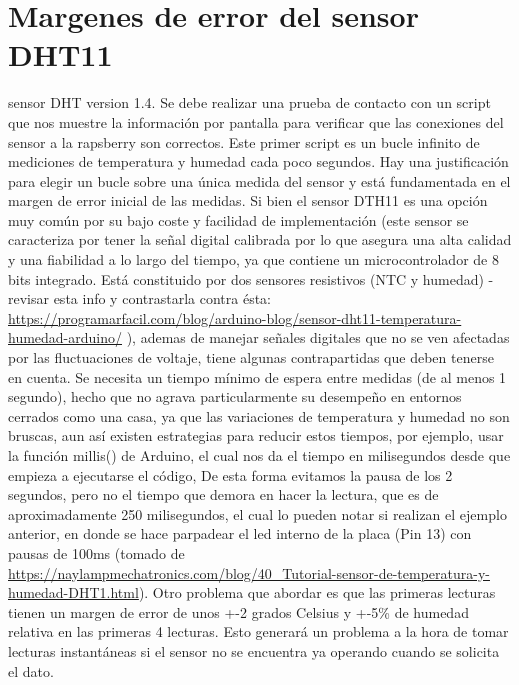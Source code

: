 \section{Margenes de error del sensor DHT11}
\label{AppendiB:key4}
sensor DHT version 1.4. Se debe realizar una prueba de contacto con un script que nos muestre la información por pantalla para verificar que las conexiones del sensor a la rapsberry son correctos. Este primer script es un bucle infinito de mediciones de temperatura y humedad cada poco segundos. Hay una justificación para elegir un bucle sobre una única medida del sensor y está fundamentada en el margen de error inicial de las medidas. Si bien el sensor DTH11 es una opción muy común por su bajo coste y facilidad de implementación (este sensor se caracteriza por tener la señal digital calibrada por lo que asegura una alta calidad y una fiabilidad a lo largo del tiempo, ya que contiene un microcontrolador de 8 bits integrado. Está constituido por dos sensores resistivos (NTC y humedad) - revisar esta info y contrastarla contra ésta: \url{https://programarfacil.com/blog/arduino-blog/sensor-dht11-temperatura-humedad-arduino/} ), ademas de manejar señales digitales que no se ven afectadas por las fluctuaciones de voltaje, tiene algunas contrapartidas que deben tenerse en cuenta. Se necesita un tiempo mínimo de espera entre medidas (de al menos 1 segundo), hecho que no agrava particularmente su desempeño en entornos cerrados como una casa, ya que las variaciones de temperatura y humedad no son bruscas, aun así existen estrategias para reducir estos tiempos, por ejemplo, usar la función millis() de Arduino, el cual nos da el tiempo en milisegundos desde que empieza a ejecutarse el código, De esta forma evitamos la pausa de los 2 segundos, pero no el tiempo que demora en hacer la lectura, que es de aproximadamente  250 milisegundos, el cual lo pueden notar si realizan el ejemplo anterior, en donde se hace parpadear el led interno de la placa (Pin 13) con pausas de 100ms (tomado de \url{https://naylampmechatronics.com/blog/40_Tutorial-sensor-de-temperatura-y-humedad-DHT1.html}). Otro problema que abordar es que las primeras lecturas tienen un margen de error de unos +-2 grados Celsius y +-5\% de humedad relativa en las primeras 4 lecturas. Esto generará un problema a la hora de tomar lecturas instantáneas si el sensor no se encuentra ya operando cuando se solicita el dato.